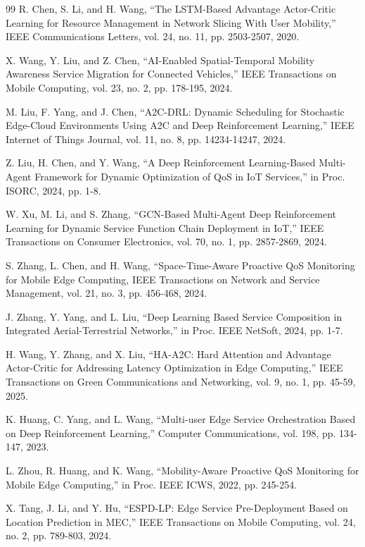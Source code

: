 \documentclass[10pt,twocolumn]{article}
\begin{document}
\begin{thebibliography}{99}
	 R. Chen, S. Li, and H. Wang, ``The LSTM-Based Advantage Actor-Critic Learning for Resource Management in Network Slicing With User Mobility,'' IEEE Communications Letters, vol. 24, no. 11, pp. 2503-2507, 2020.

	 X. Wang, Y. Liu, and Z. Chen, ``AI-Enabled Spatial-Temporal Mobility Awareness Service Migration for Connected Vehicles,'' IEEE Transactions on Mobile Computing, vol. 23, no. 2, pp. 178-195, 2024.

	 M. Liu, F. Yang, and J. Chen, ``A2C-DRL: Dynamic Scheduling for Stochastic Edge-Cloud Environments Using A2C and Deep Reinforcement Learning,'' IEEE Internet of Things Journal, vol. 11, no. 8, pp. 14234-14247, 2024.

	 Z. Liu, H. Chen, and Y. Wang, ``A Deep Reinforcement Learning-Based Multi-Agent Framework for Dynamic Optimization of QoS in IoT Services,'' in Proc. ISORC, 2024, pp. 1-8.

	 W. Xu, M. Li, and S. Zhang, ``GCN-Based Multi-Agent Deep Reinforcement Learning for Dynamic Service Function Chain Deployment in IoT,'' IEEE Transactions on Consumer Electronics, vol. 70, no. 1, pp. 2857-2869, 2024.

	 S. Zhang, L. Chen, and H. Wang, ``Space-Time-Aware Proactive QoS Monitoring for Mobile Edge Computing, IEEE Transactions on Network and Service Management, vol. 21, no. 3, pp. 456-468, 2024.

	 J. Zhang, Y. Yang, and L. Liu, ``Deep Learning Based Service Composition in Integrated Aerial-Terrestrial Networks,'' in Proc. IEEE NetSoft, 2024, pp. 1-7.

	 H. Wang, Y. Zhang, and X. Liu, ``HA-A2C: Hard Attention and Advantage Actor-Critic for Addressing Latency Optimization in Edge Computing,'' IEEE Transactions on Green Communications and Networking, vol. 9, no. 1, pp. 45-59, 2025.

	 K. Huang, C. Yang, and L. Wang, ``Multi-user Edge Service Orchestration Based on Deep Reinforcement Learning,'' Computer Communications, vol. 198, pp. 134-147, 2023.

	 L. Zhou, R. Huang, and K. Wang, ``Mobility-Aware Proactive QoS Monitoring for Mobile Edge Computing,'' in Proc. IEEE ICWS, 2022, pp. 245-254.

	 X. Tang, J. Li, and Y. Hu, ``ESPD-LP: Edge Service Pre-Deployment Based on Location Prediction in MEC,'' IEEE Transactions on Mobile Computing, vol. 24, no. 2, pp. 789-803, 2024.


\end{thebibliography}
\end{document}
